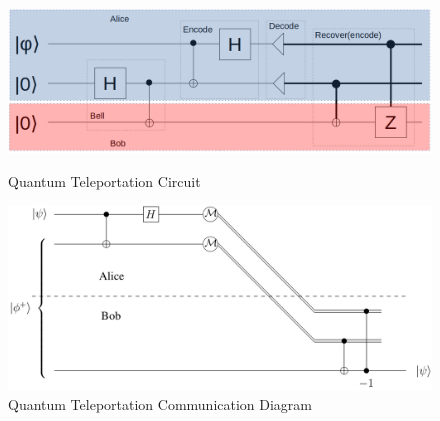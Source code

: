 \begin{figure}[t]
            {
          \begin{minipage}[b]{.48\textwidth}
                 \includegraphics[width=1\textwidth]{tele_circuit.png}
            \caption{Quantum Teleportation Circuit}
            \label{fig:background-circuit-examplea}
          \end{minipage}
          \begin{minipage}[b]{.50\textwidth}
                 \includegraphics[width=1\textwidth]{teleportation.png}
            \caption{Quantum Teleportation Communication Diagram}
            \label{fig:background-circuit-exampleb}
          \end{minipage}
         }
  \label{fig:background-circuit-example}
\end{figure}

